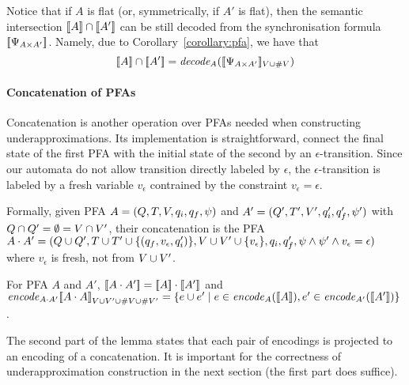 \documentclass[sigplan,review,anonymous]{acmart}\settopmatter{printfolios=true,printccs=false,printacmref=false}
\begin{document}
Notice that if $A$ is flat (or, symmetrically, if $A'$ is flat), then the semantic intersection $[\![A]\!] \cap [\![A']\!]$ can be still decoded from the synchronisation formula $[\![\Psi_{A \times A'}]\!]$. 
Namely, due to Corollary~\ref{corollary:pfa}, we have that 
$$[\![A]\!] \cap [\![A']\!] = \mathit{decode_{A}} ([\![\Psi_{A \times A'}]\!]_{V\cup \#{V}})$$ 

\paragraph{Concatenation of PFAs}
Concatenation is another operation over PFAs needed when constructing underapproximations. Its implementation is straightforward, connect the final state of the first PFA with the initial state of the second by an $\epsilon$-transition. Since our automata do not allow transition directly labeled by $\epsilon$, 
the $\epsilon$-transition is labeled by a fresh variable $v_\epsilon$ contrained by the constraint $v_\epsilon = \epsilon$. 

Formally, given PFA $A = (Q,T,V,q_i,q_f,\psi)$ and ${A'} = (Q',T',V',q_i',q_f',\psi')$ with $Q\cap Q'=\emptyset = V\cap V'$, 
their concatenation is the PFA $A\cdot A' = (Q\cup Q',T\cup T'\cup \{(q_f,v_\epsilon,q_i')\},V\cup V'\cup\{v_\epsilon\},q_i,q_f',\psi\land\psi'\land v_\epsilon = \epsilon)$ where $v_\epsilon$ is fresh, not from $V\cup V'$. 

\begin{lemma}
For PFA $A$ and $A'$, 
$[\![A\cdot A']\!] = [\![A]\!]\cdot[\![A']\!]$ and 
$\mathit{encode}_{A\cdot A'}{[\![A\cdot A]\!]}_{V\cup V' \cup \#{V}\cup\#{V'}} =
\{e \cup e'\mid e \in \mathit{encode}_{A} ([\![A]\!]),\\ e' \in\mathit{encode}_{A'} ([\![A']\!])\}$.
\end{lemma}
The second part of the lemma states that each pair of encodings is projected to an encoding of a concatenation. It is important for the correctness of underapproximation construction in the next section (the first part does suffice). 
\end{document}
